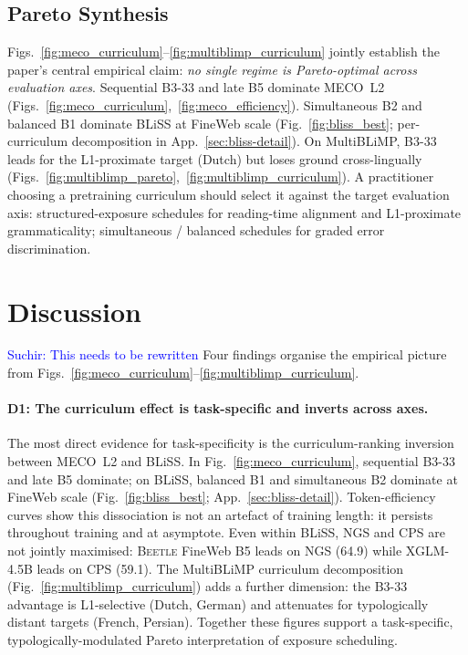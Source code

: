 \documentclass[11pt]{article}
\newcommand{\suchir}[1]{\textcolor{blue}{Suchir: #1}}
\begin{document}
\subsection{Pareto Synthesis}\label{sec:pareto}

Figs.~\ref{fig:meco_curriculum}--\ref{fig:multiblimp_curriculum} jointly establish the paper's central empirical claim: \emph{no single regime is Pareto-optimal across evaluation axes}. Sequential B3-33 and late B5 dominate MECO~L2 (Figs.~\ref{fig:meco_curriculum},~\ref{fig:meco_efficiency}). Simultaneous B2 and balanced B1 dominate BLiSS at FineWeb scale (Fig.~\ref{fig:bliss_best}; per-curriculum decomposition in App.~\ref{sec:bliss-detail}). On MultiBLiMP, B3-33 leads for the L1-proximate target (Dutch) but loses ground cross-lingually (Figs.~\ref{fig:multiblimp_pareto},~\ref{fig:multiblimp_curriculum}). A practitioner choosing a pretraining curriculum should select it against the target evaluation axis: structured-exposure schedules for reading-time alignment and L1-proximate grammaticality; simultaneous / balanced schedules for graded error discrimination.


\section{Discussion}\label{sec:discussion}
\suchir{This needs to be rewritten}
Four findings organise the empirical picture from Figs.~\ref{fig:meco_curriculum}--\ref{fig:multiblimp_curriculum}.

\paragraph{D1: The curriculum effect is task-specific and inverts across axes.} The most direct evidence for task-specificity is the curriculum-ranking inversion between MECO~L2 and BLiSS. In Fig.~\ref{fig:meco_curriculum}, sequential B3-33 and late B5 dominate; on BLiSS, balanced B1 and simultaneous B2 dominate at FineWeb scale (Fig.~\ref{fig:bliss_best}; App.~\ref{sec:bliss-detail}). Token-efficiency curves show this dissociation is not an artefact of training length: it persists throughout training and at asymptote. Even within BLiSS, NGS and CPS are not jointly maximised: \textsc{Beetle} FineWeb B5 leads on NGS (64.9) while XGLM-4.5B leads on CPS (59.1). The MultiBLiMP curriculum decomposition (Fig.~\ref{fig:multiblimp_curriculum}) adds a further dimension: the B3-33 advantage is L1-selective (Dutch, German) and attenuates for typologically distant targets (French, Persian). Together these figures support a task-specific, typologically-modulated Pareto interpretation of exposure scheduling.
\end{document}
